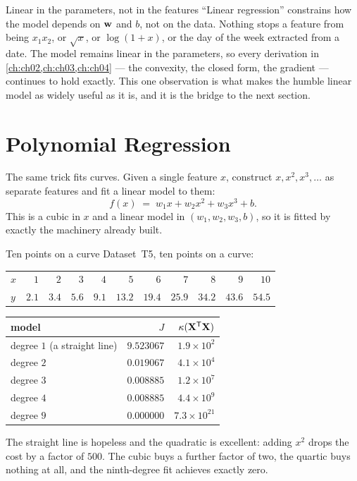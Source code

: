 \begin{keyinsight}{Linear in the parameters, not in the features}
``Linear regression'' constrains how the model depends on $\mathbf{w}$ and $b$, not on
the data. Nothing stops a feature from being $x_1x_2$, or $\sqrt{x}$, or
$\log(1+x)$, or the day of the week extracted from a date. The model remains
linear in the parameters, so every derivation in \cref{ch:ch02,ch:ch03,ch:ch04}
--- the convexity, the closed form, the gradient --- continues to hold exactly.
This one observation is what makes the humble linear model as widely useful as it
is, and it is the bridge to the next section.
\end{keyinsight}

\section{Polynomial Regression}
\label{sec:polynomial}

The same trick fits curves. Given a single feature $x$, construct
$x, x^2, x^3, \dots$ as separate features and fit a linear model to them:
\[
  f(x) \;=\; w_1x + w_2x^2 + w_3x^3 + b .
\]
This is a cubic in $x$ and a linear model in $(w_1,w_2,w_3,b)$, so it is fitted
by exactly the machinery already built.

\begin{workedexample}{Ten points on a curve}
Dataset~T5, ten points on a curve:

\begin{center}
\small
\renewcommand{\arraystretch}{1.15}
\begin{tabular}{@{}l*{10}{r}@{}}
\toprule
$x$ & $1$ & $2$ & $3$ & $4$ & $5$ & $6$ & $7$ & $8$ & $9$ & $10$\\
$y$ & $2.1$ & $3.4$ & $5.6$ & $9.1$ & $13.2$ & $19.4$ & $25.9$ & $34.2$
    & $43.6$ & $54.5$\\
\bottomrule
\end{tabular}
\end{center}

\begin{center}
\small
\renewcommand{\arraystretch}{1.2}
\begin{tabular}{@{}lrr@{}}
\toprule
model & $J$ & $\kappa(\mathbf{X}^{\mathsf{T}}\mathbf{X})$\\
\midrule
degree $1$ (a straight line) & $9.523067$ & $1.9\times10^{2}$\\
degree $2$                   & $0.019067$ & $4.1\times10^{4}$\\
degree $3$                   & $0.008885$ & $1.2\times10^{7}$\\
degree $4$                   & $0.008885$ & $4.4\times10^{9}$\\
degree $9$                   & $0.000000$ & $7.3\times10^{21}$\\
\bottomrule
\end{tabular}
\end{center}

The straight line is hopeless and the quadratic is excellent: adding $x^2$ drops
the cost by a factor of $500$. The cubic buys a further factor of two, the
quartic buys nothing at all, and the ninth-degree fit achieves exactly zero.
\end{workedexample}

